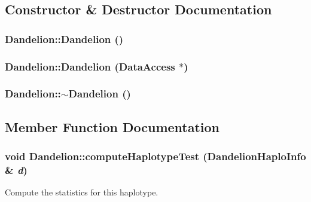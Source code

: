 \subsection{Constructor \& Destructor Documentation}
\hypertarget{classDandelion_a8acd2b60d257ea45b85db1b0313c5fc2}{
\subsubsection[{Dandelion}]{\setlength{\rightskip}{0pt plus 5cm}Dandelion::Dandelion ()}}
\label{classDandelion_a8acd2b60d257ea45b85db1b0313c5fc2}
\hypertarget{classDandelion_a94b7ff6276f9b31f3c1d25472480a062}{
\subsubsection[{Dandelion}]{\setlength{\rightskip}{0pt plus 5cm}Dandelion::Dandelion ({\bf DataAccess} $\ast$)}}
\label{classDandelion_a94b7ff6276f9b31f3c1d25472480a062}
\hypertarget{classDandelion_a48cd43f23ee97a671a5d5f55199545cb}{
\subsubsection[{$\sim$Dandelion}]{\setlength{\rightskip}{0pt plus 5cm}Dandelion::$\sim$Dandelion ()}}
\label{classDandelion_a48cd43f23ee97a671a5d5f55199545cb}


\subsection{Member Function Documentation}
\hypertarget{classDandelion_a7d005ed3065f6d59bcdb569ac60a80d1}{
\subsubsection[{computeHaplotypeTest}]{\setlength{\rightskip}{0pt plus 5cm}void Dandelion::computeHaplotypeTest ({\bf DandelionHaploInfo} \& {\em d})}}
\label{classDandelion_a7d005ed3065f6d59bcdb569ac60a80d1}
Compute the statistics for this haplotype.

